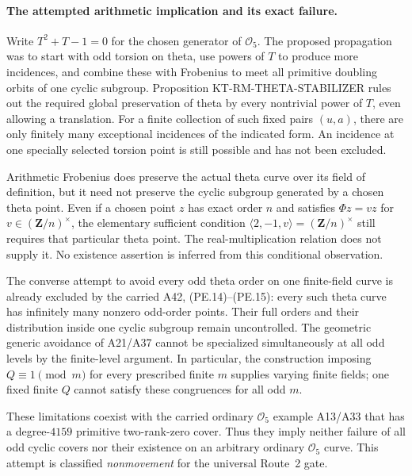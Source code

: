 \paragraph{The attempted arithmetic implication and its exact failure.}
Write $T^2+T-1=0$ for the chosen generator of $\mathcal O_5$.
The proposed propagation was to start with odd torsion on theta,
use powers of $T$ to produce more incidences, and combine these
with Frobenius to meet all primitive doubling orbits of one
cyclic subgroup.  Proposition KT-RM-THETA-STABILIZER rules out
the required global preservation of theta by every nontrivial
power of $T$, even allowing a translation.  For a finite collection
of such fixed pairs $(u,a)$, there are only finitely many exceptional
incidences of the indicated form.  An incidence at one specially
selected torsion point is still possible and has not been excluded.

Arithmetic Frobenius does preserve the actual theta curve over
its field of definition, but it need not preserve the cyclic
subgroup generated by a chosen theta point.  Even if a chosen
point $z$ has exact order $n$ and satisfies $\Phi z=vz$ for
$v\in(\mathbf Z/n)^\times$, the elementary sufficient condition
$\langle2,-1,v\rangle=(\mathbf Z/n)^\times$ still requires
that particular theta point.  The real-multiplication relation
does not supply it.  No existence assertion is inferred from
this conditional observation.

The converse attempt to avoid every odd theta order on one
finite-field curve is already excluded by the carried A42,
(PE.14)--(PE.15): every such theta curve has infinitely many
nonzero odd-order points.  Their full orders and their distribution
inside one cyclic subgroup remain uncontrolled.  The geometric
generic avoidance of A21/A37 cannot be specialized simultaneously
at all odd levels by the finite-level argument.  In particular,
the construction imposing $Q\equiv1\pmod m$ for every prescribed
finite $m$ supplies varying finite fields; one fixed finite
$Q$ cannot satisfy these congruences for all odd $m$.

These limitations coexist with the carried ordinary
$\mathcal O_5$ example A13/A33 that has a degree-$4159$
primitive two-rank-zero cover.  Thus they imply neither failure
of all odd cyclic covers nor their existence on an arbitrary
ordinary $\mathcal O_5$ curve.  This attempt is classified
\emph{nonmovement} for the universal Route~2 gate.

